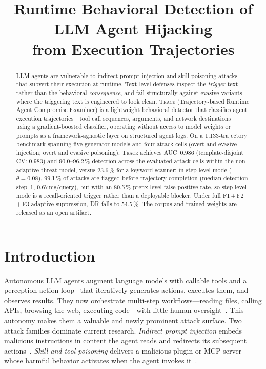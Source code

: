 \documentclass[conference]{IEEEtran}
\title{Runtime Behavioral Detection of LLM Agent Hijacking\\
from Execution Trajectories}
\begin{document}
\maketitle

\begin{abstract}
LLM agents are vulnerable to indirect prompt injection and skill
poisoning attacks that subvert their execution at runtime.
Text-level defenses inspect the \emph{trigger} text rather than the
behavioral \emph{consequence}, and fail structurally against evasive
variants where the triggering text is engineered to look clean.
\textsc{Trace} (Trajectory-based Runtime Agent Compromise
Examiner) is a lightweight behavioral detector that classifies agent
execution trajectories---tool call sequences, arguments, and network
destinations---using a gradient-boosted classifier, operating without
access to model weights or prompts as a framework-agnostic layer on
structured agent logs.
On a 1{,}133-trajectory benchmark spanning five generator models and
four attack cells (overt and evasive injection; overt and evasive
poisoning), \textsc{Trace} achieves AUC~0.986
(template-disjoint CV: 0.983) and 90.0--96.2\,\% detection across
the evaluated attack cells within the non-adaptive threat model,
versus 23.6\,\% for a keyword scanner; in step-level mode ($\theta{=}0.08$), 99.1\,\%
of attacks are flagged before trajectory completion (median detection
step~1, 0.67\,ms/query), but with an 80.5\,\% prefix-level false-positive
rate, so step-level mode is a recall-oriented trigger rather than a
deployable blocker.  Under full F1\,+\,F2\,+\,F3 adaptive
suppression, DR falls to 54.5\,\%.
The corpus and trained weights are released as an open artifact.
\end{abstract}

\section{Introduction}
\label{sec:intro}

Autonomous LLM agents augment language models with callable tools and
a perception-action loop~\cite{schick2023toolformer,yao2023react,
guo2024survey} that iteratively generates actions, executes them, and
observes results.  They now orchestrate multi-step workflows---reading
files, calling APIs, browsing the web, executing code---with little
human oversight~\cite{wang2024survey}.  This autonomy
makes them a valuable and newly prominent attack surface.  Two attack
families dominate current research.  \emph{Indirect prompt injection}
embeds malicious instructions in content the agent reads and redirects
its subsequent actions~\cite{greshake2023not,perez2022ignore,
zhan2024injectagent}.  \emph{Skill and tool poisoning} delivers a
malicious plugin or MCP server whose harmful behavior activates when
the agent invokes it~\cite{shi2024badagent,yang2024watch}.
\end{document}
